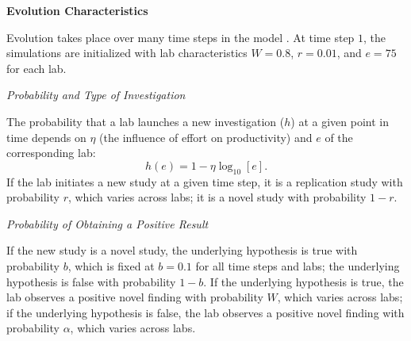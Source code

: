 \documentclass[meta, authordate,issue]{jote-new-article}
\begin{document}
\begin{adjustwidth}{-4cm}{}
  \begin{tcolorbox}[
      enhanced,
      frame hidden,
      sharp corners,
      titlerule=0pt,
      colframe=joteOrangeLight,
      colbacktitle=joteOrangeLight,
      colback=joteOrangeLight,
      coltitle=jotedark,
      fontupper={\openreg \color{jotedark}},
      fonttitle={\overpass \bfseries \LARGE \color{jotedark}},
      top=\dimexpr\smallwidth,
      bottom=\dimexpr\smallwidth,
      title={\vskip-.7em%
          Box 1: Evolution in\\ \mbox{Smalidino and Mcelreath (2016)}%
          \vspace*{.2em}},
      before upper={\parindent10pt},
    ]

    \scriptsize{

      \noindent\textbf{Evolution Characteristics}
      \vspace*{\baselineskip}

      \noindent Evolution takes place over many time steps in the model \parencite[i.e., $100,000$ in Figure~$3$ and $1,000,000$ in Figures~$4$ and $5$ of][]{SmaldinoMcelreath2016}. At time step $1$, the simulations are initialized with lab characteristics $W=0.8$, $r=0.01$, and $e=75$ for each lab.

      \vspace*{\baselineskip}
      \noindent \emph{Probability and Type of Investigation}
      \vspace*{\baselineskip}

      \noindent The probability that a lab launches a new investigation ($h$) at a given point in time depends on $\eta$ (the influence of effort on productivity) and $e$ of the corresponding lab:
      \begin{equation}
        h\left(e\right)=1-\eta\log_{10}\left[e\right]\text{.}
      \end{equation}
      If the lab initiates a new study at a given time step, it is a replication study with probability $r$, which varies across labs; it is a novel study with probability $1-r$.

      \vspace*{\baselineskip}
      \noindent\emph{Probability of Obtaining a Positive Result}
      \vspace*{\baselineskip}

      \noindent If the new study is a novel study, the underlying hypothesis is true with probability $b$, which is fixed at $b=0.1$ for all time steps and labs; the underlying hypothesis is false with probability $1-b$. If the underlying hypothesis is true, the lab observes a positive novel finding with probability $W$, which varies across labs; if the underlying hypothesis is false, the lab observes a positive novel finding with probability $\alpha$, which varies across labs.

}
\end{tcolorbox}
\end{adjustwidth}
\end{document}
